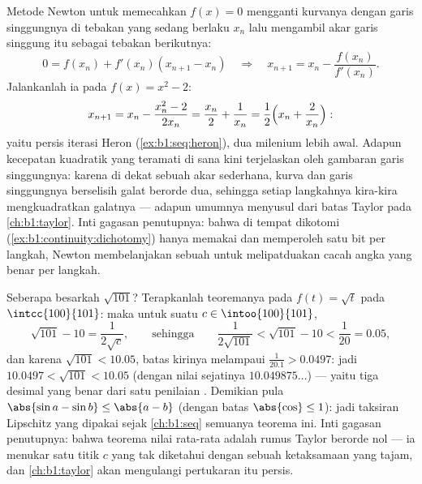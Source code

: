 \begin{example}\label{ex:b1:derivative:newton}
Metode Newton untuk memecahkan $f(x) = 0$ mengganti kurvanya dengan
garis singgungnya di tebakan yang sedang berlaku $x_n$ lalu mengambil akar garis
singgung itu sebagai tebakan berikutnya:
\[
0 = f(x_n) + f'(x_n)(x_{n+1} - x_n)
\quad\Longrightarrow\quad
x_{n+1} = x_n - \frac{f(x_n)}{f'(x_n)} .
\]
Jalankanlah ia pada $f(x) = x^2 - 2$:
\[
x_{n+1} = x_n - \frac{x_n^2 - 2}{2x_n}
= \frac{x_n}{2} + \frac{1}{x_n}
= \frac12\Bigl(x_n + \frac{2}{x_n}\Bigr) :
\]
yaitu persis iterasi Heron (\cref{ex:b1:seq:heron}), dua
milenium lebih awal. Adapun kecepatan kuadratik yang teramati di sana kini
terjelaskan oleh gambaran garis singgungnya: karena di dekat sebuah akar sederhana, kurva dan
garis singgungnya berselisih galat berorde dua, sehingga setiap langkahnya kira-kira
mengkuadratkan galatnya --- adapun  umumnya menyusul dari
batas Taylor pada \cref{ch:b1:taylor}. Inti gagasan penutupnya:
bahwa di tempat dikotomi (\cref{ex:b1:continuity:dichotomy}) hanya memakai
 dan memperoleh satu bit per langkah, Newton membelanjakan sebuah
 untuk melipatduakan cacah angka yang benar per langkah.
\end{example}

\begin{example}\label{ex:b1:derivative:mvtestimate}
Seberapa besarkah $\sqrt{101}$? Terapkanlah teoremanya pada $f(t) = \sqrt t$
pada $\intcc{100}{101}$: maka untuk suatu $c \in \intoo{100}{101}$,
\[
\sqrt{101} - 10 = \frac{1}{2\sqrt c},
\qquad\text{sehingga}\qquad
\frac{1}{2\sqrt{101}} < \sqrt{101} - 10 < \frac{1}{20} = 0.05 ,
\]
dan karena $\sqrt{101} < 10.05$, batas kirinya melampaui
$\frac{1}{20.1} > 0.0497$: jadi $10.0497 < \sqrt{101} < 10.05$
(dengan nilai sejatinya $10.049875\dots$) --- yaitu tiga desimal yang benar dari satu
penilaian . Demikian pula $\abs{\sin a - \sin b} \leq
\abs{a - b}$ (dengan batas $\abs{\cos}\leq 1$): jadi taksiran Lipschitz
yang dipakai sejak \cref{ch:b1:seq} semuanya teorema ini. Inti gagasan
penutupnya: bahwa teorema nilai rata-rata adalah rumus Taylor berorde nol
--- ia menukar satu titik $c$ yang tak diketahui dengan sebuah ketaksamaan yang tajam, dan
\cref{ch:b1:taylor} akan mengulangi pertukaran itu persis.
\end{example}


